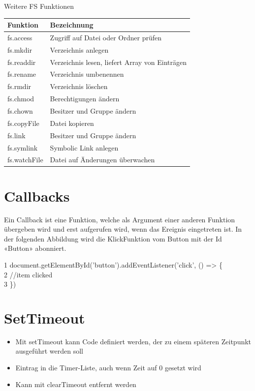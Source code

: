 Weitere FS Funktionen

\begin{center}
\begin{tabular}{|l|l|}
\hline
Funktion & Bezeichnung \\
\hline
fs.access & Zugriff auf Datei oder Ordner prüfen \\
\hline
fs.mkdir & Verzeichnis anlegen \\
\hline
fs.readdir & Verzeichnis lesen, liefert Array von Einträgen \\
\hline
fs.rename & Verzeichnis umbenennen \\
\hline
fs.rmdir & Verzeichnis löschen \\
\hline
fs.chmod & Berechtigungen ändern \\
\hline
fs.chown & Besitzer und Gruppe ändern \\
\hline
fs.copyFile & Datei kopieren \\
\hline
fs.link & Besitzer und Gruppe ändern \\
\hline
fs.symlink & Symbolic Link anlegen \\
\hline
fs.watchFile & Datei auf Änderungen überwachen \\
\hline
\end{tabular}
\end{center}

\section*{Callbacks}
Ein Callback ist eine Funktion, welche als Argument einer anderen Funktion übergeben wird und erst aufgerufen wird, wenn das Ereignis eingetreten ist. In der folgenden Abbildung wird die KlickFunktion vom Button mit der Id «Button» abonniert.

1 document.getElementById('button').addEventListener('click', () => \{\\
2 //item clicked\\
3 \})

\section*{SetTimeout}
\begin{itemize}
  \item Mit setTimeout kann Code definiert werden, der zu einem späteren Zeitpunkt ausgeführt werden soll
  \item Eintrag in die Timer-Liste, auch wenn Zeit auf 0 gesetzt wird
  \item Kann mit clearTimeout entfernt werden
\end{itemize}

